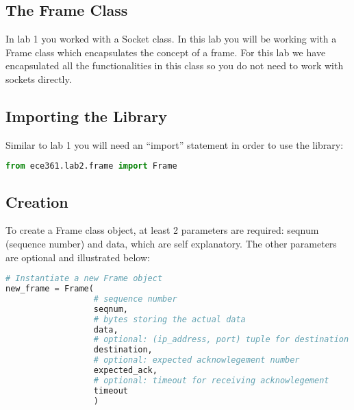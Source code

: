 \documentclass[11pt]{article}
\begin{document}
\subsection{The Frame Class}
In lab 1 you worked with a Socket class. In this lab you will be working with a Frame class which encapsulates the concept of a frame. For this lab we have encapsulated all the functionalities in this class so you do not need to work with sockets directly.

\subsection{Importing the Library}
Similar to lab 1 you will need an ``import'' statement in order to use the library:
\begin{lstlisting}[caption={Import Statement}, language=python]
from ece361.lab2.frame import Frame
\end{lstlisting}

\subsection{Creation}
To create a Frame class object, at least 2 parameters are required: seqnum (sequence number) and data, which are self explanatory. The other parameters are optional and illustrated below:
\begin{lstlisting}[caption={Frame Object Instantiation}, language=python]
# Instantiate a new Frame object
new_frame = Frame(
                  # sequence number
                  seqnum,
                  # bytes storing the actual data
                  data,
                  # optional: (ip_address, port) tuple for destination
                  destination,
                  # optional: expected acknowlegement number
                  expected_ack,
                  # optional: timeout for receiving acknowlegement
                  timeout
                  )
\end{lstlisting}
\end{document}
